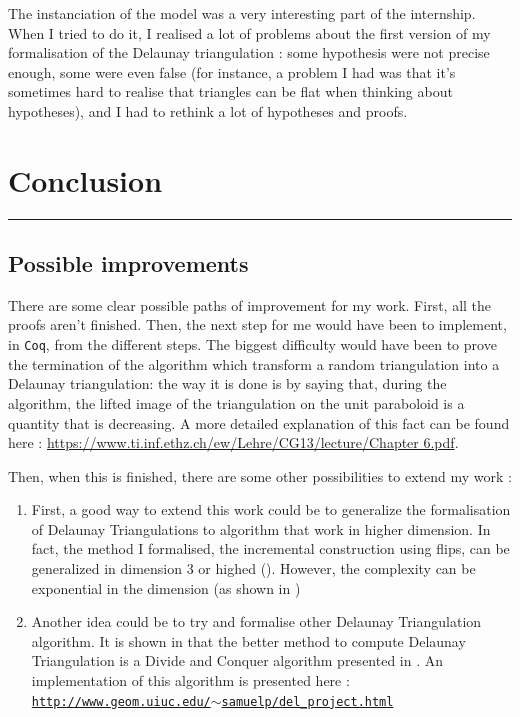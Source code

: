 \documentclass[a4paper,10pt]{article}
\begin{document}
  The instanciation of the model was a very interesting part of the internship. When I tried to do it, I realised a lot of problems about the first version of my formalisation of the Delaunay triangulation : some hypothesis were not precise enough, some were even false (for instance, a problem I had was that it's sometimes hard to realise that triangles can be flat when thinking about hypotheses), and I had to rethink a lot of hypotheses and proofs.


\newpage
\section{Conclusion}
\rule{\linewidth}{0.5pt}
\subsection{Possible improvements}

There are some clear possible paths of improvement for my work. First, all the proofs aren't finished. Then, the next step for me would have been to implement, in {\tt Coq}, from the different steps. The biggest difficulty would have been to prove the termination of the algorithm which transform a random triangulation into a Delaunay triangulation: the way it is done is by saying that, during the algorithm, the lifted image of the triangulation on the unit paraboloid is a quantity that is decreasing. A more detailed explanation of this fact can be found here :
\href{https://www.ti.inf.ethz.ch/ew/Lehre/CG13/lecture/Chapter 6.pdf}{https://www.ti.inf.ethz.ch/ew/Lehre/CG13/lecture/Chapter 6.pdf}.

Then, when this is finished, there are some other possibilities to extend my work :
\begin{enumerate}
\item First, a good way to extend this work could be to generalize the formalisation of Delaunay Triangulations to algorithm that work in higher dimension. In fact, the method I formalised, the incremental construction using flips, can be generalized in dimension 3 or highed (\cite{CompGeoAlgo}). However, the complexity can be exponential in the dimension (as shown in \cite{IncrementalDimension})
\item Another idea could be to try and formalise other Delaunay Triangulation algorithm. It is shown in \cite{Comparison} that the better method to compute Delaunay Triangulation is a Divide and Conquer algorithm presented in \cite{AlgoDivide}. An implementation of this algorithm is presented here :\\
  \href{http://www.geom.uiuc.edu/~samuelp/del_project.html}{{\tt http://www.geom.uiuc.edu/$\sim$samuelp/del\_project.html}}
\end{enumerate}
\end{document}
